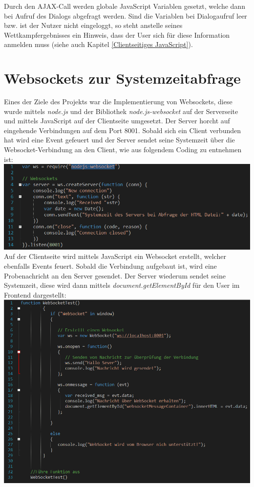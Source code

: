 Durch den AJAX-Call werden globale JavaScript Variablen gesetzt, welche dann bei Aufruf des Dialogs abgefragt werden. Sind die Variablen bei Dialogaufruf leer bzw. ist der Nutzer nicht eingeloggt, so steht anstelle seines Wettkampfergebnisses ein Hinweis, dass der User sich für diese Information anmelden muss (siehe auch Kapitel \vref{Clientseitiges JavaScript}).

\section{Websockets zur Systemzeitabfrage}
Eines der Ziele des Projekts war die Implementierung von Websockets, diese wurde mittels \textit{node.js} und der Bibliothek \textit{node.js-websocket}
auf der Serverseite und mittels JavaScript auf der Clientseite umgesetzt. Der Server horcht auf eingehende Verbindungen auf dem Port 8001. Sobald sich ein Client verbunden hat wird eine Event gefeuert und der Server sendet seine Systemzeit \"uber die Websocket-Verbindung an den Client, wie aus folgendem Coding zu entnehmen ist:  
\newline
\includegraphics[width=1\textwidth]{img/vincent/abb02.png}
\newline
Auf der Clientseite wird mittels JavaScript ein Websocket erstellt, welcher ebenfalls Events feuert. Sobald die Verbindung aufgebaut ist, wird eine Probenachricht an den Server gesendet. Der Server wiederum sendet seine Systemzeit, diese wird dann mittels \textit{document.getElementById} f\"ur den User im Frontend dargestellt: 
\newline
\includegraphics[width=1\textwidth]{img/vincent/abb03.png}
